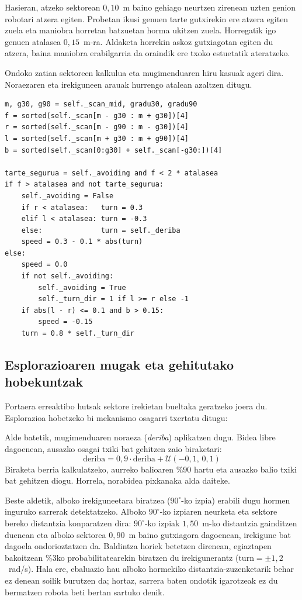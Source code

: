 Hasieran, atzeko sektorean $0{,}10$~m baino gehiago neurtzen zirenean uzten genion robotari atzera egiten. Probetan ikusi genuen tarte gutxirekin ere atzera egiten zuela eta maniobra horretan batzuetan horma ukitzen zuela. Horregatik igo genuen atalasea $0{,}15$~m-ra. Aldaketa horrekin askoz gutxiagotan egiten du atzera, baina maniobra erabilgarria da oraindik ere txoko estuetatik ateratzeko.

Ondoko zatian sektoreen kalkulua eta mugimenduaren hiru kasuak ageri dira. Noraezaren eta irekiguneen arauak hurrengo atalean azaltzen ditugu.

\begin{lstlisting}[caption={LiDAR sektoreak, bi segurtasun-atalaseak eta atzerako bultzada \texttt{rwander.py}-n.},label={lst:rwander}]
m, g30, g90 = self._scan_mid, gradu30, gradu90
f = sorted(self._scan[m - g30 : m + g30])[4]
r = sorted(self._scan[m - g90 : m - g30])[4]
l = sorted(self._scan[m + g30 : m + g90])[4]
b = sorted(self._scan[0:g30] + self._scan[-g30:])[4]

tarte_segurua = self._avoiding and f < 2 * atalasea
if f > atalasea and not tarte_segurua:
    self._avoiding = False
    if r < atalasea:   turn = 0.3
    elif l < atalasea: turn = -0.3
    else:              turn = self._deriba
    speed = 0.3 - 0.1 * abs(turn)
else:
    speed = 0.0
    if not self._avoiding:
        self._avoiding = True
        self._turn_dir = 1 if l >= r else -1
    if abs(l - r) <= 0.1 and b > 0.15:
        speed = -0.15
    turn = 0.8 * self._turn_dir
\end{lstlisting}

\subsection{Esplorazioaren mugak eta gehitutako hobekuntzak}\label{sec:oz-esplorazioa}

Portaera erreaktibo hutsak sektore irekietan bueltaka geratzeko joera du. Esplorazioa hobetzeko bi mekanismo osagarri txertatu ditugu:

Alde batetik, mugimenduaren noraeza (\emph{deriba}) aplikatzen dugu. Bidea libre dagoenean, ausazko osagai txiki bat gehitzen zaio biraketari:
\[
  \text{deriba} = 0{,}9 \cdot \text{deriba} + \mathcal{U}(-0{,}1,\, 0{,}1)
\]
Biraketa berria kalkulatzeko, aurreko balioaren \%90 hartu eta ausazko balio txiki bat gehitzen diogu. Horrela, norabidea pixkanaka alda daiteke.

Beste aldetik, alboko irekiguneetara biratzea ($90^\circ$-ko izpia) erabili dugu hormen inguruko sarrerak detektatzeko. Alboko $90^\circ$-ko izpiaren neurketa eta sektore bereko distantzia konparatzen dira: $90^\circ$-ko izpiak $1{,}50$~m-ko distantzia gainditzen duenean eta alboko sektorea $0{,}90$~m baino gutxiagora dagoenean, irekigune bat dagoela ondorioztatzen da. Baldintza horiek betetzen direnean, egiaztapen bakoitzean \%3ko probabilitatearekin biratzen du irekigunerantz ($\text{turn} = \pm 1{,}2$~rad/s). Hala ere, ebaluazio hau alboko hormekiko distantzia-zuzenketarik behar ez denean soilik burutzen da; hortaz, sarrera baten ondotik igarotzeak ez du bermatzen robota beti bertan sartuko denik.

